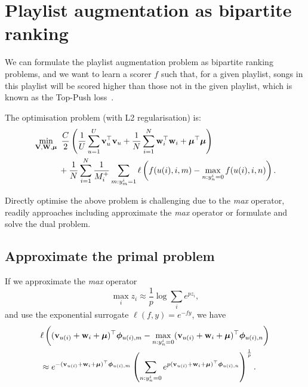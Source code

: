 \section{Playlist augmentation as bipartite ranking}

We can formulate the playlist augmentation problem as bipartite ranking problems, 
and we want to learn a scorer $f$ such that, for a given playlist, 
songs in this playlist will be scored higher than those not in the given playlist,
which is known as the Top-Push loss~\cite{li2014top}.

The optimisation problem (with L2 regularisation) is:
\begin{equation*}
\begin{aligned}
&\min_{\mathbf{V}, \mathbf{W}, \bm{\mu}} \ \frac{C}{2} \left( \frac{1}{U} \sum_{u=1}^U \mathbf{v}_u^\top \mathbf{v}_u 
     + \frac{1}{N} \sum_{i=1}^N \mathbf{w}_i^\top \mathbf{w}_i + \bm{\mu}^\top \bm{\mu} \right) \\
& \hspace{3em}
     + \frac{1}{N} \sum_{i=1}^N \frac{1}{M_i^+} \sum_{m: y_m^i = 1} \ell \left( f(u(i), i, m) - \max_{n: y_n^i = 0} f(u(i), i, n) \right).
\end{aligned}
\end{equation*}

Directly optimise the above problem is challenging due to the \emph{max} operator,
readily approaches including approximate the \emph{max} operator or formulate and solve the dual problem.


\subsection{Approximate the primal problem}
If we approximate the \emph{max} operator
\begin{equation*}
\max_i z_i \approx \frac{1}{p} \log \sum_i e^{p z_i},
\end{equation*}
and use the exponential surrogate $\ell(f, y) = e^{-fy}$, we have
\begin{equation*}
\begin{aligned}
&\ell \left( (\mathbf{v}_{u(i)} + \mathbf{w}_i + \bm{\mu})^\top \bm{\phi}_{u(i),m} - \max_{n: y_n^i = 0} (\mathbf{v}_{u(i)} + \mathbf{w}_i + \bm{\mu})^\top \bm{\phi}_{u(i),n} \right) \\
&\approx e^{-(\mathbf{v}_{u(i)} + \mathbf{w}_i + \bm{\mu})^\top \bm{\phi}_{u(i),m}}
   \left( \sum_{n: y_n^i = 0} e^{p (\mathbf{v}_{u(i)} + \mathbf{w}_i + \bm{\mu})^\top \bm{\phi}_{u(i),n}} \right)^\frac{1}{p}.
\end{aligned}
\end{equation*}

